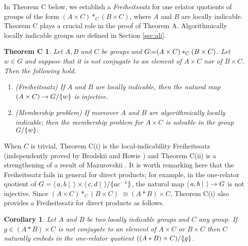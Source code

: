 \documentclass[12pt, a4paper]{amsart}
\newtheorem*{ThmC}{Theorem C}
\newtheorem{Cor}[Thm]{Corollary}
\theoremstyle{remark}
\theoremstyle{definition}
\begin{document}
In Theorem C below, we establish a \emph{Freiheitssatz} for one relator quotients of groups of the form $(A\times C)*_C(B\times C)$, where $A$ and $B$ are locally indicable. Theorem C plays a crucial role in the proof of Theorem A. Algorithmically locally indicable groups are defined in Section \ref{sec:ali}.
\begin{ThmC}
Let $A, B$ and $C$ be  groups and  $G{\mathrel{\mathop\mathchar"303A}\mkern-1.2mu=} (A\times C)*_C(B\times C)$. Let $w\in G$ and suppose that it is not conjugate to an element of $A\times C$ nor of $B\times C$. 
Then the following hold.
\begin{enumerate}
\item[{\rm(i)}](Freiheitssatz) If $A$ and $B$ are locally indicable, then the natural map $(A\times C)\to G/{{\langle}{\mkern-3.7mu}{\lvert}{\mkern1.2mu}{{w}}{\mkern1.2mu}{\rvert}{\mkern-3.7mu}{\rangle}}$ is injective.
\item[{\rm(ii)}](Membership problem) If moreover  $A$ and $B$ are algorithmically locally indicable;
then the membership problem for $A\times C$ is solvable in the group $G/{{\langle}{\mkern-3.7mu}{\lvert}{\mkern1.2mu}{{w}}{\mkern1.2mu}{\rvert}{\mkern-3.7mu}{\rangle}}.$ 
\end{enumerate}
\end{ThmC}

When $C$ is trivial, Theorem C(i)  is the local-indicability Freiheitssatz (independently proved by Brodskii \cite{Brodskii84} and Howie \cite{Howie81}) and Theorem C(ii) is a strengthening of a result of Mazurovskii \cite{Mazurovskii}. It is worth remarking here that the Freiheitssatz fails in general for direct products;
for example, in the one-relator quotient of $G={\langle\mkern3mu{a,b\mid\;}\mkern3mu\rangle}\times {\langle\mkern3mu{c,d\mid \;}\mkern3mu\rangle}/{{\langle}{\mkern-3.7mu}{\lvert}{\mkern1.2mu}{{ac^{-1}}}{\mkern1.2mu}{\rvert}{\mkern-3.7mu}{\rangle}}$, the natural map ${\langle\mkern3mu{a,b\mid \:}\mkern3mu\rangle}\to G$ is not injective.
Since $(A\times C)*_C (B \times C)$ $ \cong (A*B) \times C$, Theorem C(i) also provides a Freiheitssatz for direct products as follows. 

\begin{Cor}
Let $A$ and $B$ be two locally indicable groups and $C$ any group. If  $g\in (A*B)\times C$ is not conjugate to an element of $A\times C$ or $B\times C$ then $C$ naturally embeds in the one-relator quotient  $((A*B)\times C)/{{\langle}{\mkern-3.7mu}{\lvert}{\mkern1.2mu}{{g}}{\mkern1.2mu}{\rvert}{\mkern-3.7mu}{\rangle}}$.
\end{Cor}
\end{document}
